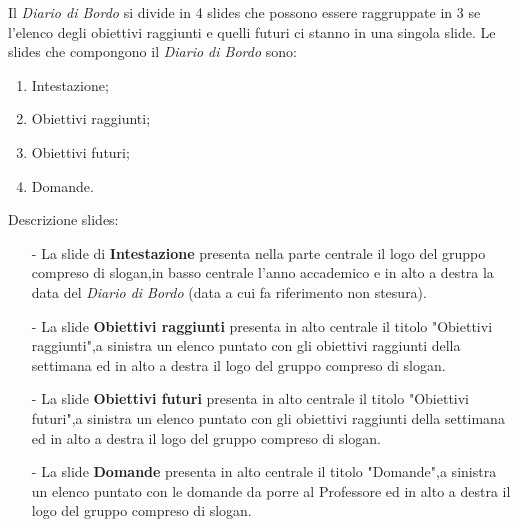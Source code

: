 Il \textit{Diario di Bordo} si divide in 4 slides che possono essere raggruppate in 3 se l'elenco degli obiettivi raggiunti e quelli futuri ci stanno
in una singola slide.
Le slides che compongono il \textit{Diario di Bordo} sono:
\begin{enumerate}
    \item Intestazione;
    \item Obiettivi raggiunti;
    \item Obiettivi futuri;
    \item Domande.
\end{enumerate}
Descrizione slides:
\begin{itemize}
    \item [-] La slide di \textbf{Intestazione} presenta nella parte centrale il logo del gruppo compreso di slogan,in basso centrale l'anno accademico e in alto a destra la data del 
    \textit{Diario di Bordo} (data a cui fa riferimento non stesura).
    \item [-] La slide \textbf{Obiettivi raggiunti} presenta in alto centrale il titolo "Obiettivi raggiunti",a sinistra un elenco puntato con gli obiettivi raggiunti
    della settimana ed in alto a destra il logo del gruppo compreso di slogan.
    \item [-] La slide \textbf{Obiettivi futuri} presenta in alto centrale il titolo "Obiettivi futuri",a sinistra un elenco puntato con gli obiettivi raggiunti
    della settimana ed in alto a destra il logo del gruppo compreso di slogan.
    \item [-] La slide \textbf{Domande} presenta in alto centrale il titolo "Domande",a sinistra un elenco puntato con le domande da porre al Professore ed in alto a destra il logo del gruppo compreso di slogan.
\end{itemize}